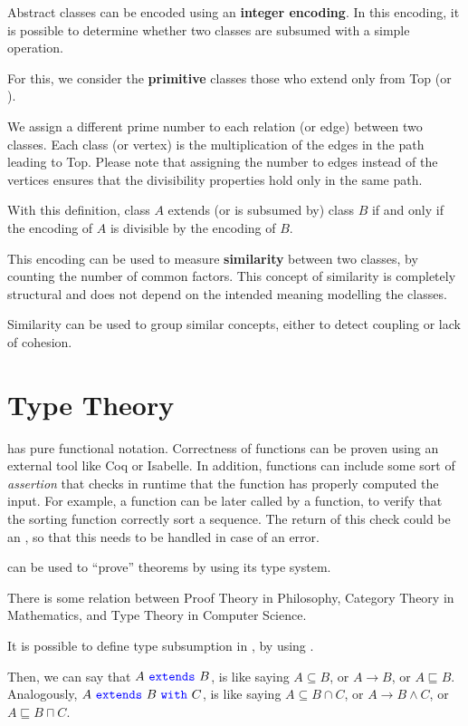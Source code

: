 Abstract classes can be encoded using an \textbf{integer encoding}.
In this encoding, it is possible to determine whether two classes are subsumed with a simple operation.

For this, we consider the \textbf{primitive} classes those who extend only from Top (or ).

We assign a different prime number to each relation (or edge) between two classes.
Each class (or vertex) is the multiplication of the edges in the path leading to Top.
Please note that assigning the number to edges instead of the vertices ensures that the divisibility properties hold only in the same path.

With this definition, class $A$ extends (or is subsumed by) class $B$ if and only if the encoding of $A$ is divisible by the encoding of $B$.

This encoding can be used to measure \textbf{similarity} between two classes, by counting the number of common factors.
This concept of similarity is completely structural and does not depend on the intended meaning modelling the classes.

Similarity can be used to group similar concepts, either to detect coupling or lack of cohesion.


\section{Type Theory}

\Soda has pure functional notation.
Correctness of functions can be proven using an external tool like Coq or Isabelle.
In addition, functions can include some sort of \textit{assertion} that checks in runtime that the function has properly computed the input.
For example, a  function can be later called by a  function, to verify that the sorting function correctly sort a sequence.
The return of this check could be an , so that this needs to be handled in case of an error.

\Soda can be used to ``prove'' theorems by using its type system.

There is some relation between Proof Theory in Philosophy, Category Theory in Mathematics, and Type Theory in Computer Science.

It is possible to define type subsumption in \Soda, by using \sextends.

Then, we can say that $A \ \sextends\ B$, is like saying $A \subseteq B$, or $A \to B$, or $A \sqsubseteq B$.
Analogously, $A \ \sextends\ B \ \swith\ C$, is like saying $A \subseteq B \cap C $, or $A \to B \land C$, or $A \sqsubseteq B \sqcap C$.

